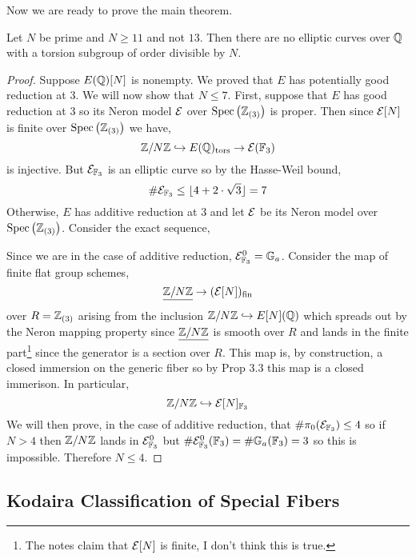 \documentclass[12pt]{article}
\begin{document}
Now we are ready to prove the main theorem. 

\begin{theorem}[Mazur]
Let $N$ be prime and $N \ge 11$ and not $13$. Then there are no elliptic curves over $\mathbb{Q}$ with a torsion subgroup of order divisible by $N$.
\end{theorem}

\begin{proof}
Suppose $E(\mathbb{Q})[N]$ is nonempty. We proved that $E$ has potentially good reduction at $3$. We will now show that $N \le 7$. First, suppose that $E$ has good reduction at $3$ so its Neron model $\mathcal{E}$ over $\mathrm{Spec}\left( \mathbb{Z}_{(3)} \right)$ is proper. Then since $\mathcal{E}[N]$ is finite over $\mathrm{Spec}\left( \mathbb{Z}_{(3)} \right)$ we have,
\[ \mathbb{Z} / N \mathbb{Z} \hookrightarrow E(\mathbb{Q})_{\mathrm{tors}} \to \mathcal{E}(\mathbb{F}_3) \]
is injective. But $\mathcal{E}_{\mathbb{F}_3}$ is an elliptic curve so by the Hasse-Weil bound,
\[ \# \mathcal{E}_{\mathbb{F}_3} \le \lfloor 4 + 2 \cdot \sqrt{3} \rfloor = 7 \]
Otherwise, $E$ has additive reduction at $3$ and let $\mathcal{E}$ be its Neron model over $\mathrm{Spec}\left( \mathbb{Z}_{(3)} \right)$. Consider the exact sequence,
\begin{center}
\end{center}
Since we are in the case of additive reduction, $\mathcal{E}^0_{\mathbb{F}_3} = {\mathbb{G}_a}$. Consider the map of finite flat group schemes,
\[ \underline{\mathbb{Z} / N \mathbb{Z}} \to (\mathcal{E}[N])_{\mathrm{fin}} \]
over $R = \mathbb{Z}_{(3)}$ arising from the inclusion $\mathbb{Z} / N \mathbb{Z} \hookrightarrow E[N](\mathbb{Q})$ which spreads out by the Neron mapping property since $\underline{\mathbb{Z} / N \mathbb{Z}}$ is smooth over $R$ and lands in the finite part\footnote{The notes claim that $\mathcal{E}[N]$ is finite, I don't think this is true.} since the generator is a section over $R$. This map is, by construction, a closed immersion on the generic fiber so by Prop 3.3 this map is a closed immerison. In particular,
\[ \mathbb{Z} / N \mathbb{Z} \hookrightarrow \mathcal{E}[N]_{\mathbb{F}_3} \]
We will then prove, in the case of additive reduction, that $\# \pi_0(\mathcal{E}_{\mathbb{F}_3}) \le 4$ so if $N > 4$ then $\mathbb{Z} / N \mathbb{Z}$ lands in $\mathcal{E}^0_{\mathbb{F}_3}$ but $\# \mathcal{E}^0_{\mathbb{F}_3}(\mathbb{F}_3) = \# {\mathbb{G}_a}(\mathbb{F}_3) = 3$ so this is impossible. Therefore $N \le 4$. 
\end{proof}

\subsection{Kodaira Classification of Special Fibers}
\end{document}
